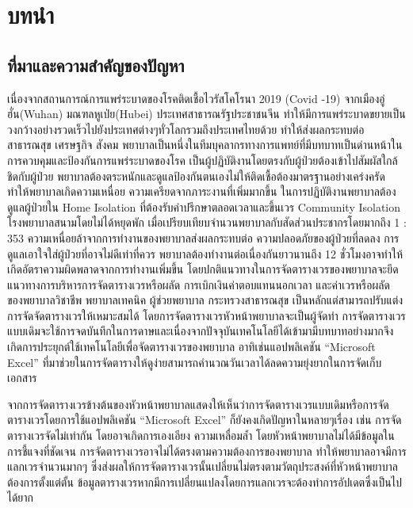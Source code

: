 \renewcommand{\theequation}{\thechapter.\arabic{equation}}
\baselineskip=8mm
\chapter{บทนำ}

\renewcommand{\thesection}{\thechapter.\arabic{section}}
\renewcommand{\theequation}{\thesection.\arabic{equation}}



\section{ที่มาและความสำคัญของปัญหา}

เนื่องจากสถานการณ์การแพร่ระบาดของโรคติดเชื้อไวรัสโคโรนา 2019 (Covid -19) จากเมืองอู่ฮั่น(Wuhan) มณฑลหูเป่ย(Hubei) ประเทศสาธารณรัฐประชาชนจีน ทำให้มีการแพร่ระบาดขยายเป็นวงกว้างอย่างรวดเร็วไปยังประเทศต่างๆทั่วโลกรวมถึงประเทศไทยด้วย ทำให้ส่งผลกระทบต่อสาธารณสุข เศรษฐกิจ สังคม \cite{wuhan:hupei}
พยาบาลเป็นหนึ่งในทีมบุคลากรทางการแพทย์ที่มีบทบาทเป็นด่านหน้าในการควบคุมและป้องกันการแพร่ระบาดของโรค เป็นผู้ปฏิบัติงานโดยตรงกับผู้ป่วยต้องเข้าไปสัมผัสใกล้ชิดกับผู้ป่วย พยาบาลต้องตระหนักและดูแลป้องกันตนเองไม่ให้ติดเชื้อต้องมาตรฐานอย่างเคร่งครัด \cite{nurse:covid}
ทำให้พยาบาลเกิดความเหนื่อย ความเครียดจากภาระงานที่เพิ่มมากขึ้น ในการปฏิบัติงานพยาบาลต้องดูแลผู้ป่วยใน Home Isolation ที่ต้องรับคำปรึกษาตลอดเวลาและขึ้นเวร Community Isolation โรงพยาบาลสนามโดยไม่ได้หยุดพัก \cite{nurse:Isolation}
เมื่อเปรียบเทียบจำนวนพยาบาลกับสัดส่วนประชากรโดยมากถึง 1 : 353 \cite{people:nurse} ความเหนื่อยล้าจากการทํางานของพยาบาลส่งผลกระทบต่อ ความปลอดภัยของผู้ป่วยที่ลดลง การดูแลเอาใจใส่ผู้ป่วยที่อาจไม่ดีเท่าที่ควร พยาบาลต้องทํางานต่อเนื่องกันยาวนานถึง 12 ชั่วโมงอาจทําให้เกิดอัตราความผิดพลาดจากการทํางานเพิ่มขึ้น \cite{ngeaun:nurse}
โดยปกติแนวทางในการจัดตารางเวรของพยาบาลจะยึด แนวทางการบริหารการจัดตารางเวรหรือผลัด การเบิกเงินค่าตอบแทนนอกเวลา และค่าเวรหรือผลัด ของพยาบาลวิชาชีพ พยาบาลเทคนิค ผู้ช่วยพยาบาล กระทรวงสาธารณสุข เป็นหลักแต่สามารถปรับแต่งการจัดจัดตารางเวรให้เหมาะสมได้ \cite{tarang:nurse}
โดยการจัดตารางเวรหัวหน้าพยาบาลจะเป็นผู้จัดทำ การจัดตารางเวรแบบเดิมจะใช้การจดบันทึกในการดาษและเนื่องจากปัจจุบันเทคโนโลยีได้เข้ามามีบทบาทอย่างมากจึงเกิดการประยุกต์ใช้เทคโนโลยีเพื่อจัดตารางเวรของพยาบาล อาทิเช่นแอปพลิเคชัน “Microsoft Excel” ที่มาช่วยในการจัดตารางให้ดูง่ายสามารถคำนวณวันเวลาได้ลดความยุ่งยากในการจัดเก็บเอกสาร \cite{excel:headnurse}

จากการจัดตารางเวรข้างต้นของหัวหน้าพยาบาลแสดงให้เห็นว่าการจัดตารางเวรแบบเดิมหรือการจัดตารางเวรโดยการใช้แอปพลิเคชัน “Microsoft Excel” ก็ยังคงเกิดปัญหาในหลายๆเรื่อง เช่น การจัดตารางเวรจัดไม่เท่ากัน โดยอาจเกิดการเองเอียง ความเหลื่อมล้ำ โดยหัวหน้าพยาบาลไม่ได้มีข้อมูลในการชี้แจงที่ชัดเจน การจัดตารางเวรอาจไม่ได้ตรงตามความต้องการของพยาบาล ทำให้พยาบาลอาจมีการแลกเวรจำนวนมากๆ ซึ่งส่งผลให้การจัดตารางเวรนั้นเปลี่ยนไม่ตรงตามวัตถุประสงค์ที่หัวหน้าพยาบาลต้องการตั้งแต่ตั้น ข้อมูลตารางเวรหากมีการเปลี่ยนแปลงโดยการแลกเวรจะต้องทำการอัปเดตซึ่งเป็นไปได้ยาก 


